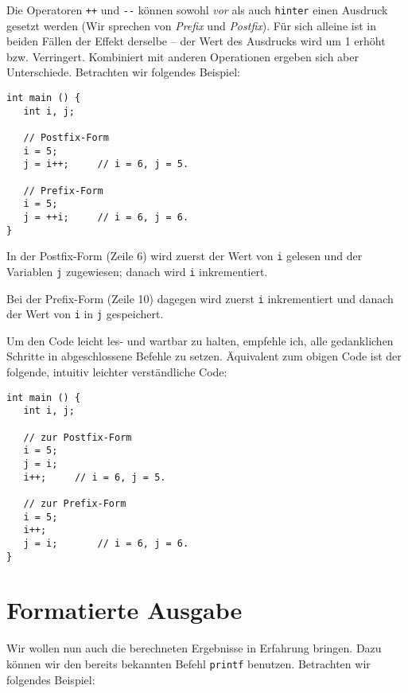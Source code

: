 \begin{hintbox}
Die Operatoren \texttt{++} und \texttt{-{}-} können sowohl \emph{vor} als auch \texttt{hinter} einen Ausdruck gesetzt werden (Wir sprechen von \emph{Prefix} und \emph{Postfix}). Für sich alleine ist in beiden Fällen der Effekt derselbe -- der Wert des Ausdrucks wird um 1 erhöht bzw. Verringert. Kombiniert mit anderen Operationen ergeben sich aber Unterschiede. Betrachten wir folgendes Beispiel:

\begin{codebox}
\begin{verbatim}
int main () {
   int i, j;
   
   // Postfix-Form
   i = 5;
   j = i++;		// i = 6, j = 5.
   
   // Prefix-Form
   i = 5;
   j = ++i;		// i = 6, j = 6.
}
\end{verbatim}
\end{codebox}

In der Postfix-Form (Zeile 6) wird zuerst der Wert von \texttt{i} gelesen und der Variablen \texttt{j} zugewiesen; danach wird \texttt{i} inkrementiert.

Bei der Prefix-Form (Zeile 10) dagegen wird zuerst \texttt{i} inkrementiert und danach der Wert von \texttt{i} in \texttt{j} gespeichert.
\end{hintbox}
%
\begin{hintbox}[]
Um den Code leicht les- und wartbar zu halten, empfehle ich, alle gedanklichen Schritte in abgeschlossene Befehle zu setzen. Äquivalent zum obigen Code ist der folgende, intuitiv leichter verständliche Code:

\begin{codebox}
\begin{verbatim}
int main () {
   int i, j;
   
   // zur Postfix-Form
   i = 5;
   j = i;
   i++;		// i = 6, j = 5.
   
   // zur Prefix-Form
   i = 5;
   i++;
   j = i;		// i = 6, j = 6.
}
\end{verbatim}
\end{codebox}
\end{hintbox}

\section{Formatierte Ausgabe}\label{sec:formattedOutput}
Wir wollen nun auch die berechneten Ergebnisse in Erfahrung bringen. Dazu können wir den bereits bekannten Befehl \texttt{printf} benutzen. Betrachten wir folgendes Beispiel:

